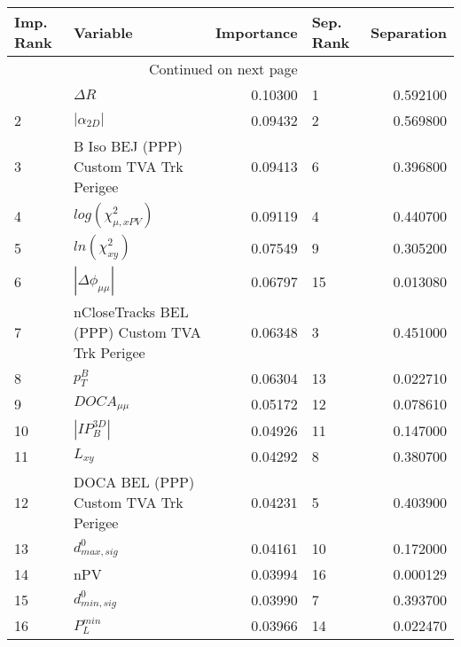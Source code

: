 \usepackage{lscape}

\begin{landscape}
\begin{longtable}{llrlr}
\toprule
Imp. Rank &                                       Variable &  Importance & Sep. Rank &  Separation \\
\midrule
\endhead
\midrule
\multicolumn{3}{r}{{Continued on next page}} \\
\midrule
\endfoot

\bottomrule
\endlastfoot
        1 &                                     $\Delta R$ &     0.10300 &         1 &    0.592100 \\
        2 &                                $|\alpha_{2D}|$ &     0.09432 &         2 &    0.569800 \\
        3 &         B Iso BEJ (PPP) Custom TVA Trk Perigee &     0.09413 &         6 &    0.396800 \\
        4 &                      $log(\chi^{2}_{\mu,xPV})$ &     0.09119 &         4 &    0.440700 \\
        5 &                            $ln(\chi^{2}_{xy})$ &     0.07549 &         9 &    0.305200 \\
        6 &                       $|\Delta \phi_{\mu\mu}|$ &     0.06797 &        15 &    0.013080 \\
        7 &  nCloseTracks BEL (PPP) Custom TVA Trk Perigee &     0.06348 &         3 &    0.451000 \\
        8 &                                      $p^B_{T}$ &     0.06304 &        13 &    0.022710 \\
        9 &                                $DOCA_{\mu\mu}$ &     0.05172 &        12 &    0.078610 \\
       10 &                                $|IP_{B}^{3D}|$ &     0.04926 &        11 &    0.147000 \\
       11 &                                       $L_{xy}$ &     0.04292 &         8 &    0.380700 \\
       12 &          DOCA BEL (PPP) Custom TVA Trk Perigee &     0.04231 &         5 &    0.403900 \\
       13 &                               $d^0_{max, sig}$ &     0.04161 &        10 &    0.172000 \\
       14 &                                            nPV &     0.03994 &        16 &    0.000129 \\
       15 &                               $d^0_{min, sig}$ &     0.03990 &         7 &    0.393700 \\
       16 &                                  $P^{min}_{L}$ &     0.03966 &        14 &    0.022470 \\
\end{longtable}

\end{landscape}
